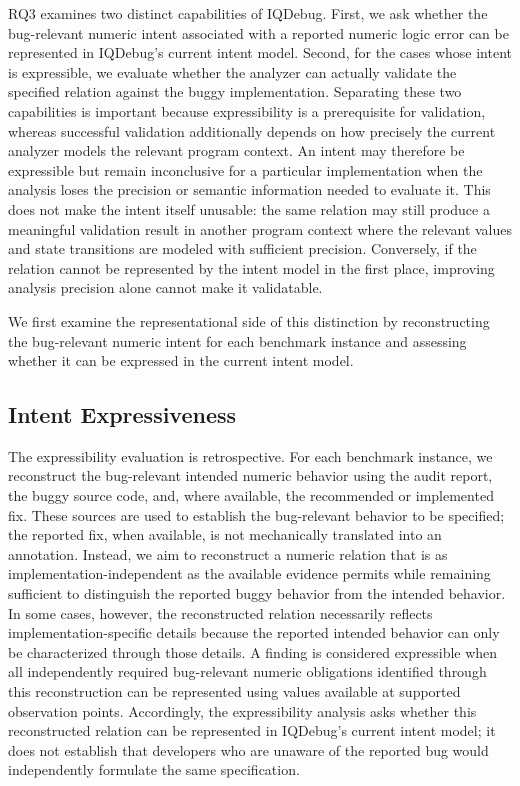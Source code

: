 \documentclass[11pt,oneside]{report}
\theoremstyle{plain}
\theoremstyle{definition}
\theoremstyle{remark}
\begin{document}
RQ3 examines two distinct capabilities of IQDebug. First, we ask whether the bug-relevant numeric intent associated with a reported numeric logic error can be represented in IQDebug's current intent model. Second, for the cases whose intent is expressible, we evaluate whether the analyzer can actually validate the specified relation against the buggy implementation. Separating these two capabilities is important because expressibility is a prerequisite for validation, whereas successful validation additionally depends on how precisely the current analyzer models the relevant program context. An intent may therefore be expressible but remain inconclusive for a particular implementation when the analysis loses the precision or semantic information needed to evaluate it. This does not make the intent itself unusable: the same relation may still produce a meaningful validation result in another program context where the relevant values and state transitions are modeled with sufficient precision. Conversely, if the relation cannot be represented by the intent model in the first place, improving analysis precision alone cannot make it validatable.

We first examine the representational side of this distinction by reconstructing the bug-relevant numeric intent for each benchmark instance and assessing whether it can be expressed in the current intent model.

\subsection{Intent Expressiveness}\label{subsec:eval:rq3:expressiveness}

The expressibility evaluation is retrospective. For each benchmark instance, we reconstruct the bug-relevant intended numeric behavior using the audit report, the buggy source code, and, where available, the recommended or implemented fix. These sources are used to establish the bug-relevant behavior to be specified; the reported fix, when available, is not mechanically translated into an annotation. Instead, we aim to reconstruct a numeric relation that is as implementation-independent as the available evidence permits while remaining sufficient to distinguish the reported buggy behavior from the intended behavior. In some cases, however, the reconstructed relation necessarily reflects implementation-specific details because the reported intended behavior can only be characterized through those details. A finding is considered expressible when all independently required bug-relevant numeric obligations identified through this reconstruction can be represented using values available at supported observation points. Accordingly, the expressibility analysis asks whether this reconstructed relation can be represented in IQDebug's current intent model; it does not establish that developers who are unaware of the reported bug would independently formulate the same specification.
\end{document}
